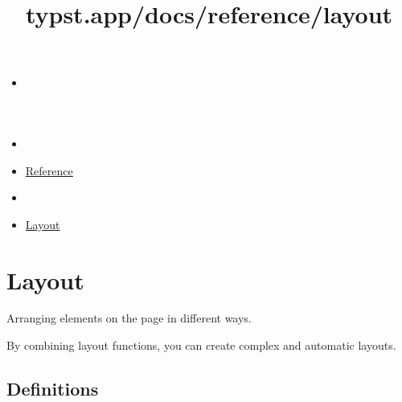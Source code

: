 \title{typst.app/docs/reference/layout}

\begin{itemize}
\tightlist
\item
  \href{/docs}{}
\item
  
\item
  \href{/docs/reference/}{Reference}
\item
  
\item
  \href{/docs/reference/layout/}{Layout}
\end{itemize}

\section{Layout}\label{summary}

Arranging elements on the page in different ways.

By combining layout functions, you can create complex and automatic
layouts.

\subsection{Definitions}\label{definitions}

